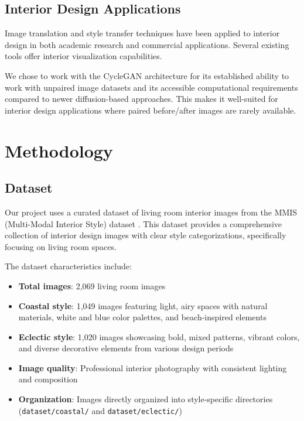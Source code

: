 \documentclass[twocolumn,superscriptaddress,aps]{revtex4-1}
\begin{document}
\subsection{Interior Design Applications}
Image translation and style transfer techniques have been applied to interior design in both academic research and commercial applications. Several existing tools offer interior visualization capabilities. 

We chose to work with the CycleGAN architecture for its established ability to work with unpaired image datasets and its accessible computational requirements compared to newer diffusion-based approaches. This makes it well-suited for interior design applications where paired before/after images are rarely available.

\section{Methodology}

\subsection{Dataset}

Our project uses a curated dataset of living room interior images from the MMIS (Multi-Modal Interior Style) dataset \cite{mmis2023dataset}. This dataset provides a comprehensive collection of interior design images with clear style categorizations, specifically focusing on living room spaces.

The dataset characteristics include:

\begin{itemize}
    \item \textbf{Total images}: 2,069 living room images
    \item \textbf{Coastal style}: 1,049 images featuring light, airy spaces with natural materials, white and blue color palettes, and beach-inspired elements
    \item \textbf{Eclectic style}: 1,020 images showcasing bold, mixed patterns, vibrant colors, and diverse decorative elements from various design periods
    \item \textbf{Image quality}: Professional interior photography with consistent lighting and composition
    \item \textbf{Organization}: Images directly organized into style-specific directories (\texttt{dataset/coastal/} and \texttt{dataset/eclectic/})
\end{itemize}
\end{document}
